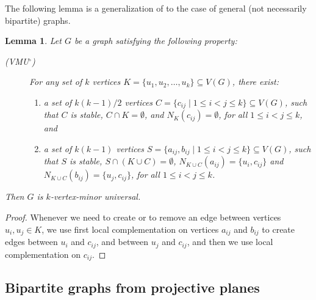 \documentclass[10pt,a4paper]{article}
\newtheorem{lemma}{Lemma}[section]
\newcommand{\ls}{\leqslant}
\begin{document}
The following lemma is a generalization of   to the case of general (not necessarily bipartite) graphs.

\begin{lemma}\label{lemma:VMUcondition_circ}
    Let $G$ be a graph satisfying the following property:
%
    \begin{description}
        \item[{\rm\em (VMU$^\circ$)}] For any set of $k$  vertices $K = \{u_1, u_2, \dots, u_k\} \subseteq V(G)$, there exist:
              \begin{enumerate}%
                  \item a set of $k(k-1)/2$  vertices $C = \{c_{ij} \mid 1 \ls i < j \ls k \} \subseteq V(G)$, such that $C$ is stable,  $C\cap K = \emptyset$, and $N_K(c_{ij}) = \emptyset$, for all $1\ls i < j \ls k$,
                        and
                  \item a set of $k(k-1)$  vertices $S = \{a_{ij},b_{ij} \mid 1 \ls i < j \ls k \} \subseteq V(G)$, such that $S$ is stable, $S\cap (K \cup C) = \emptyset$, $N_{K \cup C}(a_{ij}) = \{u_i, c_{ij}\}$ and $N_{K \cup C}(b_{ij}) = \{u_j, c_{ij}\}$, for all $1 \ls i < j \ls k$.
              \end{enumerate}
    \end{description}
    Then $G$ is $k$-vertex-minor universal.
\end{lemma}
\begin{proof}
    Whenever we need to create or to remove an edge between vertices $u_i, u_j\in K$, we use first local complementation on vertices $a_{ij}$ and $b_{ij}$ to create edges between $u_i$ and $c_{ij}$, and between $u_j$ and $c_{ij}$, and then we use local complementation on $c_{ij}$.
\end{proof}


\subsection{Bipartite graphs from projective planes}
\label{subsec:bipartite-graph-proj-plane}
\end{document}
